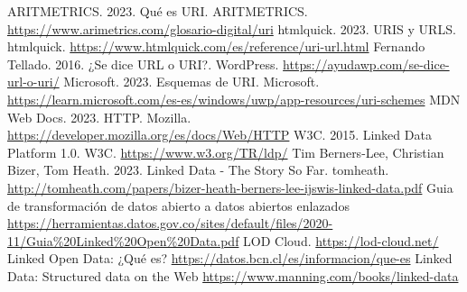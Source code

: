 \documentclass[11pt]{report}
\begin{document}
\begin{thebibliography}{99}
	 ARITMETRICS. 2023. Qué es URI. ARITMETRICS. \url{https://www.arimetrics.com/glosario-digital/uri}
	 htmlquick. 2023. URIS y URLS. htmlquick. \url{https://www.htmlquick.com/es/reference/uri-url.html}
	 Fernando Tellado. 2016. ¿Se dice URL o URI?. WordPress. \url{https://ayudawp.com/se-dice-url-o-uri/}
	 Microsoft. 2023. Esquemas de URI. Microsoft. \url{https://learn.microsoft.com/es-es/windows/uwp/app-resources/uri-schemes}
	 MDN Web Docs. 2023. HTTP. Mozilla. \url{https://developer.mozilla.org/es/docs/Web/HTTP}
	 W3C. 2015. Linked Data Platform 1.0. W3C. \url{https://www.w3.org/TR/ldp/}
	 Tim Berners-Lee, Christian Bizer, Tom Heath. 2023. Linked Data - The Story So Far. tomheath. \url{http://tomheath.com/papers/bizer-heath-berners-lee-ijswis-linked-data.pdf}
	 Guia de transformación de datos abierto a datos abiertos enlazados \url{https://herramientas.datos.gov.co/sites/default/files/2020-11/Guia%20Linked%20Open%20Data.pdf}
	 LOD Cloud. \url{https://lod-cloud.net/}
	 Linked Open Data: ¿Qué es?	\url{https://datos.bcn.cl/es/informacion/que-es}
	 Linked Data: Structured data on the Web \url{https://www.manning.com/books/linked-data}
\end{thebibliography}
\end{document}
